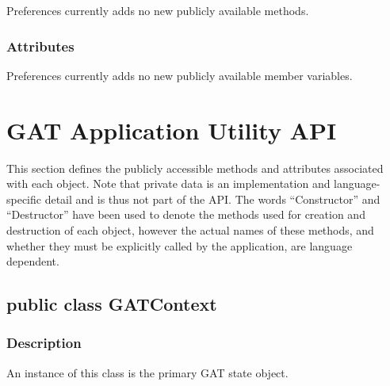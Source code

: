 \documentclass[$Date: 2003/06/26 19:29:31 $]{glabarticle}
\begin{document}
Preferences currently adds no new publicly available methods. 


\subsubsection{Attributes}

Preferences currently adds no new publicly available member variables. 


\newpage

\section{GAT Application Utility API}
\label{sec:GAT-App-Util-API}

This section defines the publicly accessible methods and attributes
associated with each object.  Note that private data is an
implementation and language-specific detail and is thus not part of
the API.  The words ``Constructor'' and ``Destructor'' have been used
to denote the methods used for creation and destruction of each
object, however the actual names of these methods, and whether they
must be explicitly called by the application, are language dependent.


\subsection{public class GATContext}


\subsubsection{Description}

An instance of this class is the primary GAT state object.
\end{document}
